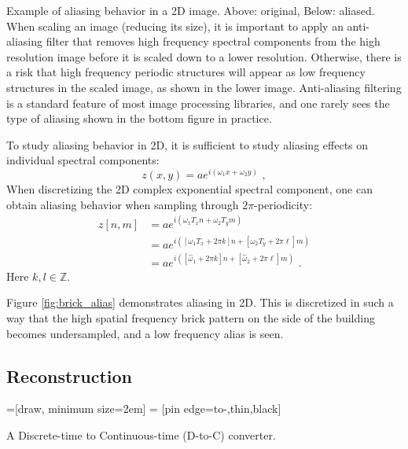 \begin{marginfigure}
\begin{center}
\end{center}
\caption{Example of aliasing behavior in a 2D image. Above: original, Below: aliased. When scaling an image (reducing its size), 
it is important to apply an anti-aliasing filter that removes high frequency spectral components from the 
high resolution image before it is scaled down to a lower resolution. Otherwise, there is a risk that high frequency periodic structures 
will appear as low frequency structures in the scaled image, as shown in the lower image. 
Anti-aliasing filtering is a standard feature of most image processing libraries, and one rarely sees the type of aliasing shown in the bottom figure in practice.}
\label{fig:brick_alias}
\end{marginfigure}
To study aliasing behavior in 2D, it is sufficient to study aliasing effects on individual spectral components:
\begin{equation}
z(x,y) = a e^{i (\omega_1 x + \omega_2 y) }\,\,,
\end{equation}
When discretizing the 2D complex exponential spectral component, one can obtain aliasing behavior when sampling through $2\pi$-periodicity:
\begin{align}
z[n,m] &= a e^{i(\omega_1 T_x n + \omega_2 T_y m ) }\\
      &=a e^{i([\omega_1 T_x + 2\pi k]n + [\omega_2 T_y + 2\pi \ell]m)} \\
      &=a e^{i([\hat{\omega}_1 + 2\pi k]n + [\hat{\omega}_{2} + 2\pi \ell]m)}\,\,.
\end{align}
Here $k,l \in \mathbb{Z}$. 

Figure \ref{fig:brick_alias} demonstrates aliasing in 2D. This is
discretized in such a way that the high spatial frequency brick
pattern on the side of the building becomes undersampled, and a low
frequency alias is seen.


\subsection{Reconstruction}
\begin{marginfigure}
=[draw, minimum size=2em]
 = [pin edge={to-,thin,black}]
\begin{center}
\end{center}
\caption{A Discrete-time to Continuous-time (D-to-C) converter.}
\end{marginfigure}

